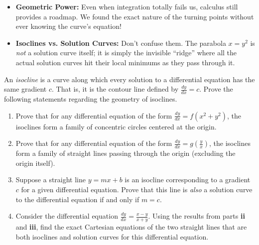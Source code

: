\begin{takeaways}
\begin{itemize}[leftmargin=*]
    \item \textbf{Geometric Power:} Even when integration totally fails us, calculus still provides a roadmap. We found the exact nature of the turning points without ever knowing the curve's equation!
    \item \textbf{Isoclines vs. Solution Curves:} Don't confuse them. The parabola $x=y^2$ is \textit{not} a solution curve itself; it is simply the invisible ``ridge'' where all the actual solution curves hit their local minimums as they pass through it.
\end{itemize}
\end{takeaways}

\begin{problem}
An \textit{isocline} is a curve along which every solution to a differential equation has the same gradient $c$. That is, it is the contour line defined by $\frac{dy}{dx} = c$. Prove the following statements regarding the geometry of isoclines.

\begin{enumerate}
    \item[\textbf{i}] Prove that for any differential equation of the form $\frac{dy}{dx} = f(x^2 + y^2)$, the isoclines form a family of concentric circles centered at the origin.
    \item[\textbf{ii}] Prove that for any differential equation of the form $\frac{dy}{dx} = g\left(\frac{y}{x}\right)$, the isoclines form a family of straight lines passing through the origin (excluding the origin itself).
    \item[\textbf{iii}] Suppose a straight line $y = mx + b$ is an isocline corresponding to a gradient $c$ for a given differential equation. Prove that this line is \textit{also} a solution curve to the differential equation if and only if $m = c$.
    \item[\textbf{iv}] Consider the differential equation $\frac{dy}{dx} = \frac{x-y}{x+y}$. Using the results from parts \textbf{ii} and \textbf{iii}, find the exact Cartesian equations of the two straight lines that are both isoclines and solution curves for this differential equation.
\end{enumerate}
\end{problem}

